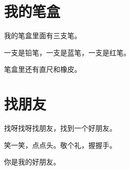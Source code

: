 \documentclass[12pt,UTF-8,openany]{ctexbook}
\begin{document}
\chapter{我的笔盒}

\begin{large}
    
    我的笔盒里面有三支笔。
    
    一支是铅笔，一支是蓝笔，一支是红笔。
    
    笔盒里还有直尺和橡皮。
    
\end{large}


\clearpage

\begin{center}
    
\end{center}


\hanzibox{}\hanzibox{}\hanzibox{}\hanzibox{}\hspace{1em}\hanzibox{}\hanzibox{}\hanzibox{}\hanzibox{}

\hanzibox{}\hanzibox{}\hanzibox{}\hanzibox{}\hspace{1em}\hanzibox{}\hanzibox{}\hanzibox{}\hanzibox{}

\hanzibox{}\hanzibox{}\hanzibox{}\hanzibox{}\hspace{1em}\hanzibox{}\hanzibox{}\hanzibox{}\hanzibox{}

\hanzibox{}\hanzibox{}\hanzibox{}\hanzibox{}\hspace{1em}




\chapter{找朋友}

\begin{large}
    
    找呀找呀找朋友，找到一个好朋友。
    
    笑一笑，点点头。敬个礼，握握手。
    
    你是我的好朋友。
    
\end{large}


\clearpage

\begin{center}
    
\end{center}
\end{document}
